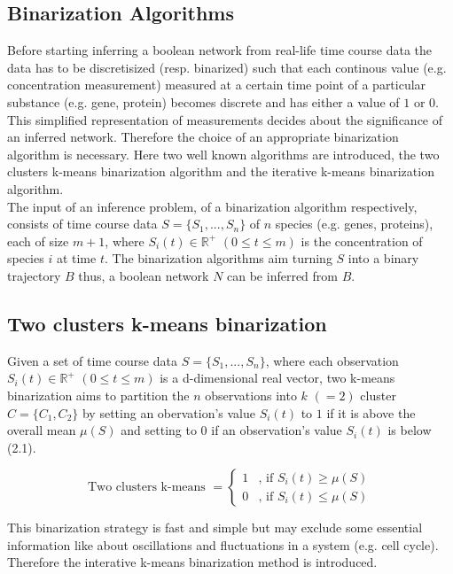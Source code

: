 \subsection{Binarization Algorithms}

Before starting inferring a boolean network from real-life time course data the data has to be discretisized (resp. binarized) such that each continous value (e.g. concentration measurement) measured at a certain time point of a particular substance (e.g. gene, protein) becomes discrete and has either a value of $1$ or $0$. This simplified representation of measurements decides about the significance of an inferred network. Therefore the choice of an appropriate binarization algorithm is necessary. Here two well known algorithms are introduced, the two clusters k-means binarization algorithm and the iterative k-means binarization algorithm.\\
The input of an inference problem, of a binarization algorithm respectively, consists of time course data $S=\{S_{1}, ...,S_{n}\}$ of $n$ species (e.g. genes, proteins), each of size $m+1$, where $S_{i}(t)\in\mathbb{R^{+}}$ $(0\le t \le m)$ is the concentration of species $i$ at time $t$. The binarization algorithms aim turning $S$ into a binary trajectory $B$ thus, a boolean network $N$ can be inferred from $B$.

\subsection*{Two clusters k-means binarization}
Given a set of time course data $S=\{S_{1}, ...,S_{n}\}$, where each observation $S_{i}(t)\in\mathbb{R^{+}}$ $(0\le t \le m)$ is a d-dimensional real vector, two k-means binarization aims to partition the $n$ observations into $k$ $(=2)$ cluster $C=\{C_{1},C_{2}\}$ by setting an obervation's value $S_{i}(t)$ to $1$ if it is above the overall mean $\mu(S)$ and setting to $0$ if an observation's value $S_{i}(t)$ is below (2.1).

\begin{equation}
\text{Two clusters k-means }=\begin{cases}
1 & \text{, if }S_{i}(t)\ge \mu (S)\\
0 & \text{, if }S_{i}(t)\le \mu (S)
\end{cases}
\end{equation}

This binarization strategy is fast and simple but may exclude some essential information like about oscillations and fluctuations in a system (e.g. cell cycle). Therefore the interative k-means binarization method is introduced.



